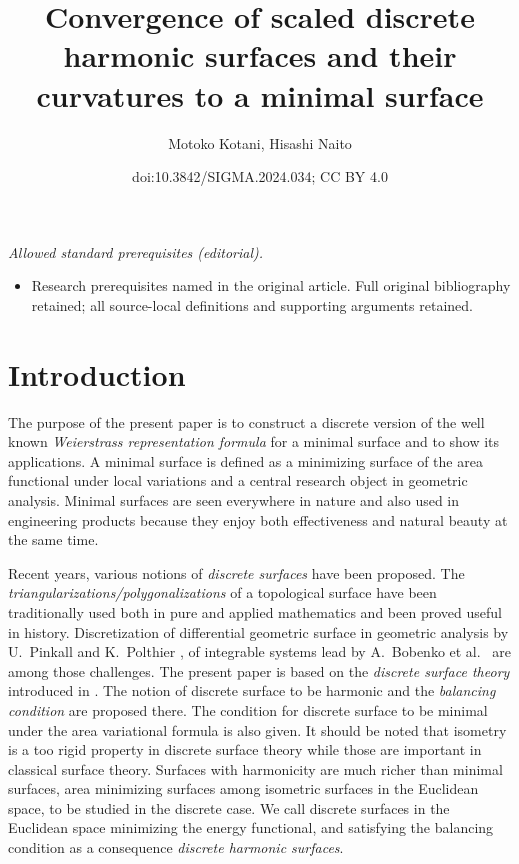 \documentclass[10pt,a4paper]{amsart}
\title{Convergence of scaled discrete harmonic surfaces and their curvatures to a minimal surface}
\author{Motoko Kotani, Hisashi Naito}
\date{doi:10.3842/SIGMA.2024.034; CC BY 4.0}
\newcommand{\1}{{\bf 1}}
\numberwithin{equation}{section}
\begin{document}
\maketitle
\noindent\textit{Allowed standard prerequisites (editorial).}\begin{itemize}
\item Research prerequisites named in the original article. Full original bibliography retained; all source-local definitions and supporting arguments retained.
\end{itemize}\medskip
\section{Introduction}
The purpose of the present paper is to construct a discrete version of the well known
{\em Weierstrass representation formula} for a minimal surface and to show its applications.
A minimal surface is defined as a minimizing surface of the area functional under local variations
and a central research object in geometric analysis.
Minimal surfaces are seen everywhere in nature and also used in engineering products
because they enjoy both effectiveness and natural beauty at the same time.

Recent years, various notions of {\em discrete surfaces} have been proposed.
The {\em triangularizations/polygonalizations} of a topological surface have been traditionally used
both in pure and applied mathematics and been proved useful in history.
Discretization of differential geometric surface in geometric analysis by U.~Pinkall and K.~Polthier
\cite{bobenko-pinkall, pinkall-polthier}, of integrable systems lead by A.~Bobenko et al.\
\cite{bobenko-bucking-sechelmann, bobenko-hoffmann, bobenko-pottmann-wallner}
are among those challenges.
The present paper is based on the {\em discrete surface theory} introduced in \cite{kotani-naito-omori}.
The notion of discrete surface to be harmonic and the {\em balancing condition} are proposed there.
The condition for discrete surface to be minimal under the area variational formula is also given.
It should be noted that isometry is a too rigid property in discrete surface theory while those are important in classical surface theory.
Surfaces with harmonicity are much richer than minimal surfaces,
area minimizing surfaces among isometric surfaces in the Euclidean space, to be studied in the discrete case.
We call discrete surfaces in the Euclidean space minimizing the energy functional,
and satisfying the balancing condition as a consequence {\em discrete harmonic surfaces}.
\end{document}
